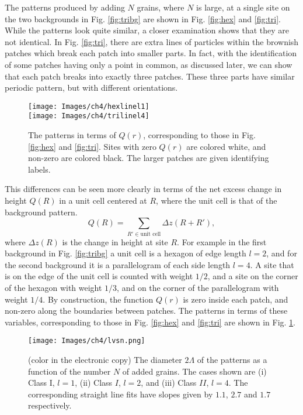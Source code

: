 \documentclass[11pt,a4paper]{book}
\begin{document}
The patterns produced by adding $N$ grains, where $N$ is large, at a single
site on the two backgrounds in Fig. \ref{fig:tribg} are shown in
Fig. \ref{fig:hex} and \ref{fig:tri}. While the patterns look quite
similar, a closer examination shows that they are not identical. In
Fig. \ref{fig:tri}, there are extra lines of particles within the
brownish patches which break each patch into smaller parts. In fact,
with the identification of some patches having only a point in common,
as discussed later, we can show that each patch breaks into exactly
three patches. These three parts have similar periodic pattern, but
with different orientations.
%
\begin{figure}
\begin{center}
\texttt{[image: Images/ch4/hexlinel1]}\\
\texttt{[image: Images/ch4/trilinel4]}
\caption{The patterns in terms of $Q\left( r \right)$, corresponding
to those in Fig. \ref{fig:hex} and \ref{fig:tri}. Sites with zero
$Q\left( r \right)$ are colored white, and non-zero are colored black.
The larger patches are given identifying labels.}
\label{fig:line}
\end{center}
\end{figure}
%

This differences can be seen more clearly in terms of the net excess
change in height ${Q\left( R \right)}$ in a unit cell centered at
$R$, where the unit cell is that of the background pattern.
\begin{equation}
Q\left( R \right)=\sum_{R'\in \textrm{unit cell}}\Delta z(R+R'),
\end{equation}
where $\Delta z\left( R \right)$ is the change in height at site $R$.
For example in the first background in Fig. \ref{fig:tribg} a unit
cell is a hexagon of edge length $l=2$, and for the second background
it is a parallelogram of each side length $l=4$. A site that is on the edge of
the unit cell is counted with weight $1/2$, and a site on the corner
of the hexagon with weight $1/3$, and on the corner of the
parallelogram with weight $1/4$. By construction, the function
$Q\left(r\right)$ is zero inside each patch, and non-zero along the
boundaries between patches. The patterns in terms of these variables,
corresponding to those in Fig. \ref{fig:hex} and \ref{fig:tri} are
shown in Fig. \ref{fig:line}.
%
\begin{SCfigure}
\texttt{[image: Images/ch4/lvsn.png]}
\caption{(color in the electronic copy) The diameter $2\Lambda$ of the patterns as a function of the
number $N$ of  added  grains. The cases shown are  (i) Class I, $l=1$,
(ii) Class $I$, $l= 2$, and (iii) Class $II$, $l=4$. The corresponding
straight line fits have slopes given by $1.1$, $2.7$ and $1.7$ respectively.}
\label{fig:triln}
\end{SCfigure}
%
\end{document}

